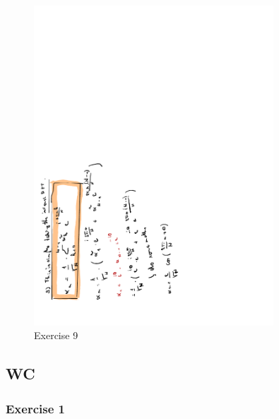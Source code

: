 \documentclass[a4paper]{report}
\begin{document}
\begin{figure}[H]
	\centering
	\includegraphics[angle=-90, width=0.8\textwidth]{assets/huis_9_ex_9.pdf}
	\caption{Exercise 9}
\end{figure}

\subsection{WC}

\subsubsection{Exercise 1}
\end{document}

